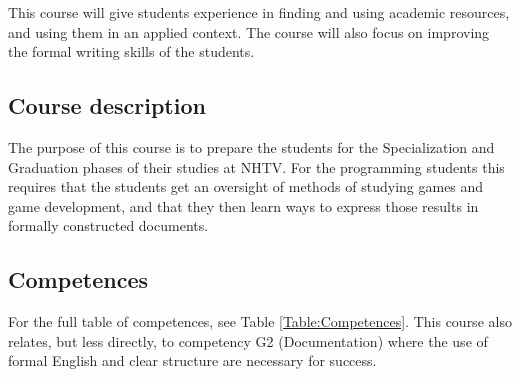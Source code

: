 \documentclass{article}
\begin{document}
This course will give students experience in finding and using academic resources, and using them in an applied context. The course will also focus on improving the formal writing skills of the students.


\subsection{Course description}
The purpose of this course is to prepare the students for the Specialization and Graduation phases of their studies at NHTV. For the programming students this requires that the students get an oversight of methods of studying games and game development, and that they then learn ways to express those results in formally constructed documents.


\subsection{Competences}
For the full table of competences, see Table \ref{Table:Competences}. This course also relates, but less directly, to competency G2 (Documentation) where the use of formal English and clear structure are necessary for success.
\end{document}
